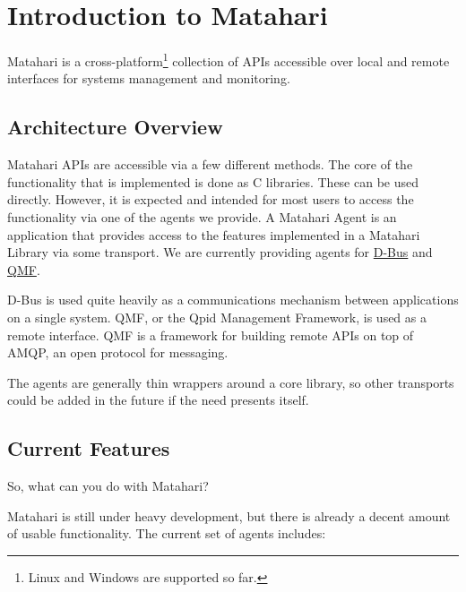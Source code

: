 \section{Introduction to Matahari}

Matahari is a cross-platform\footnote{Linux and Windows are supported so far.} collection of APIs accessible over local and remote interfaces for systems management and monitoring.

\subsection{Architecture Overview}

Matahari APIs are accessible via a few different methods. The core of the functionality that is implemented is done as C libraries. These can be used directly. However, it is expected and intended for most users to access the functionality via one of the agents we provide. A Matahari Agent is an application that provides access to the features implemented in a Matahari Library via some transport. We are currently providing agents for \href{http://www.freedesktop.org/wiki/Software/dbus}{D-Bus} and \href{http://qpid.apache.org/}{QMF}.

D-Bus is used quite heavily as a communications mechanism between applications on a single system. QMF, or the Qpid Management Framework, is used as a remote interface. QMF is a framework for building remote APIs on top of AMQP, an open protocol for messaging.

The agents are generally thin wrappers around a core library, so other transports could be added in the future if the need presents itself. 

\subsection{Current Features}

So, what can you do with Matahari?

Matahari is still under heavy development, but there is already a decent amount of usable functionality. The current set of agents includes:


